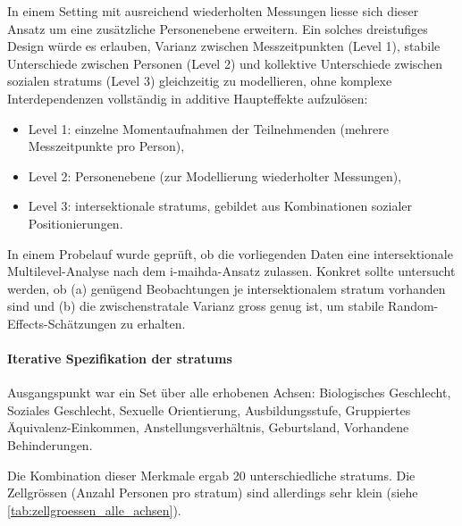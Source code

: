 
In einem Setting mit ausreichend wiederholten Messungen liesse sich dieser Ansatz um eine zusätzliche Personenebene erweitern. Ein solches dreistufiges Design würde es erlauben, Varianz zwischen Messzeitpunkten (Level 1), stabile Unterschiede zwischen Personen (Level 2) und kollektive Unterschiede zwischen sozialen \glspl{stratum} (Level 3) gleichzeitig zu modellieren, ohne komplexe Interdependenzen vollständig in additive Haupteffekte aufzulösen:

\begin{itemize}
\item Level 1: einzelne Momentaufnahmen der Teilnehmenden (mehrere Messzeitpunkte pro Person),
\item Level 2: Personenebene (zur Modellierung wiederholter Messungen),
\item Level 3: intersektionale \glspl{stratum}, gebildet aus Kombinationen sozialer Positionierungen.
\end{itemize}

\vspace{1em}

In einem Probelauf wurde geprüft, ob die vorliegenden Daten eine intersektionale Multilevel-Analyse nach dem \gls{i-maihda}-Ansatz zulassen. Konkret sollte untersucht werden, ob (a) genügend Beobachtungen je intersektionalem \gls{stratum} vorhanden sind und (b) die zwischenstratale Varianz gross genug ist, um stabile Random-Effects-Schätzungen zu erhalten.

\paragraph{Iterative Spezifikation der \glspl{stratum}}
Ausgangspunkt war ein Set über alle erhobenen Achsen: Biologisches Geschlecht, Soziales Geschlecht, Sexuelle Orientierung, Ausbildungsstufe, Gruppiertes Äquivalenz-Einkommen, Anstellungsverhältnis, Geburtsland, Vorhandene Behinderungen.

Die Kombination dieser Merkmale ergab 20 unterschiedliche \glspl{stratum}. Die Zellgrössen (Anzahl Personen pro \gls{stratum}) sind allerdings sehr klein (siehe \cref{tab:zellgroessen_alle_achsen}).

